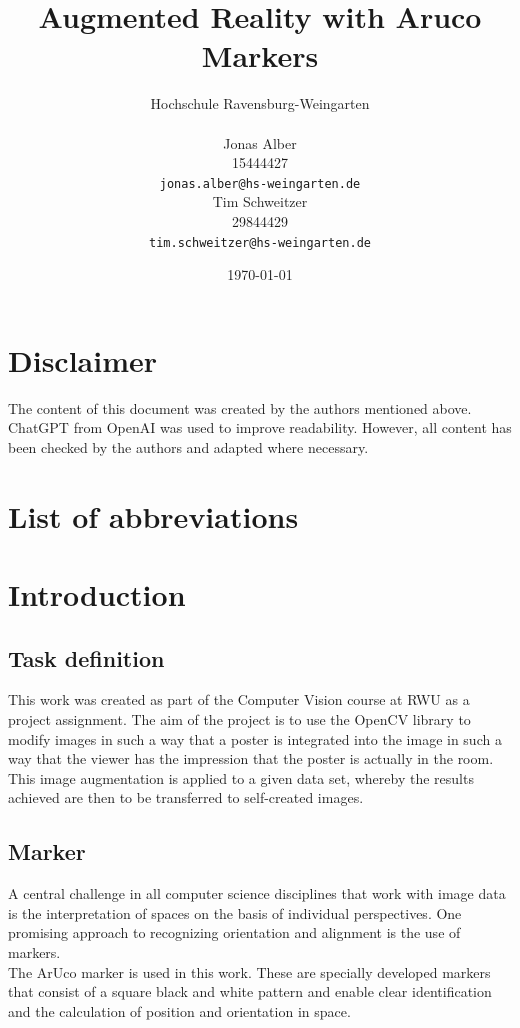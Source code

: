 \documentclass[a4paper,twocolumn]{article}
\title{Augmented Reality with Aruco Markers}
\author{
    Hochschule Ravensburg-Weingarten \\[1em] %
    \begin{minipage}[t]{0.45\textwidth} %
        \centering
        Jonas Alber \\ %
        15444427\\
        \texttt{jonas.alber@hs-weingarten.de} %
    \end{minipage}
    \hfill
    \begin{minipage}[t]{0.45\textwidth} %
        \centering
        Tim Schweitzer \\  29844429 \\ %
        \texttt{tim.schweitzer@hs-weingarten.de} %
    \end{minipage}
}
\date{\today}
\begin{document}
\maketitle

\section*{Disclaimer}
The content of this document was created by the authors mentioned above. ChatGPT from OpenAI was used to improve readability. However, all content has been checked by the authors and adapted where necessary.

\section*{List of abbreviations}
\begin{acronym}[RWU]
\end{acronym}

\section{Introduction}

\subsection{Task definition}
This work was created as part of the Computer Vision course at \ac{RWU} as a project assignment. The aim of the project is to use the OpenCV library to modify images in such a way that a poster is integrated into the image in such a way that the viewer has the impression that the poster is actually in the room.
\\
This image augmentation is applied to a given data set, whereby the results achieved are then to be transferred to self-created images.

\subsection{Marker}
A central challenge in all computer science disciplines that work with image data is the interpretation of spaces on the basis of individual perspectives. One promising approach to recognizing orientation and alignment is the use of markers.
\\
The ArUco marker is used in this work. These are specially developed markers that consist of a square black and white pattern and enable clear identification and the calculation of position and orientation in space. \cite{aruco1}
\end{document}
